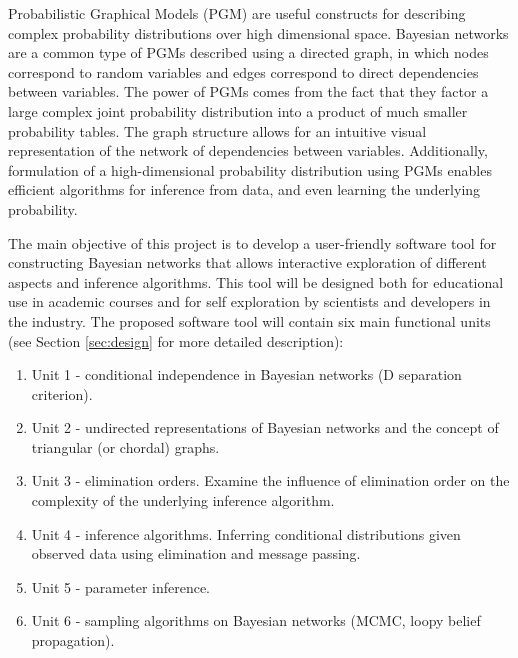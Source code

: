\documentclass{article}
\newcommand{\comment}[2]{
	\todo[color=GreenYellow,inline]{
		\underline{\textbf{#1:}} #2
	}}
\begin{document}
    Probabilistic Graphical Models (PGM) are useful constructs for describing complex probability distributions over high dimensional space.
    Bayesian networks are a common type of PGMs described using a directed graph, in which nodes correspond to random variables and edges correspond to direct dependencies between variables.
    The power of PGMs comes from the fact that they factor a large complex joint probability distribution into a product of much smaller probability tables.
    The graph structure allows for an intuitive visual representation of the network of dependencies between variables.
    Additionally, formulation of a high-dimensional probability distribution using PGMs enables efficient algorithms for inference from data, and even learning the underlying probability.
 
The main objective of this project is to develop a user-friendly software tool for constructing Bayesian networks that allows interactive exploration of different aspects and inference algorithms. This tool will be designed both for educational use in academic courses and for self exploration by scientists and developers in the industry. The proposed software tool will contain six main functional units (see Section \ref{sec:design} for more detailed description):
    \begin{enumerate}
        \item Unit 1 - conditional independence in Bayesian networks (D separation criterion).
        \item Unit 2 - undirected representations of Bayesian networks and the concept of triangular (or chordal) graphs.
        \item Unit 3 - elimination orders. Examine the influence of elimination order on the complexity of the underlying inference algorithm.
        \item Unit 4 - inference algorithms. Inferring conditional distributions given observed data using elimination and message passing.
        \item Unit 5 - parameter inference.
        \item Unit 6 - sampling algorithms on Bayesian networks (MCMC, loopy belief propagation).
    \end{enumerate}
\end{document}
